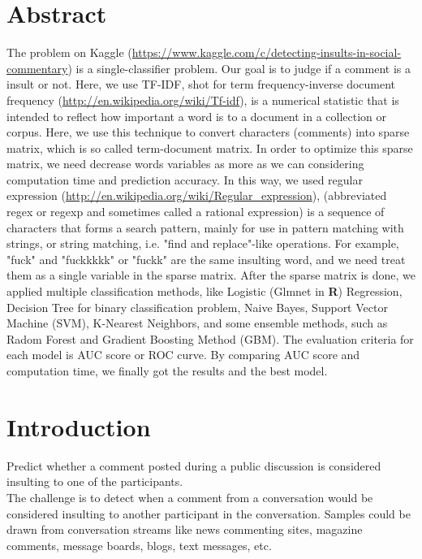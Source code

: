 \documentclass[11pt]{article}
\begin{document}
\begin{singlespacing}
\section{Abstract}
The problem on Kaggle (\url{https://www.kaggle.com/c/detecting-insults-in-social-commentary}) is a single-classifier problem. Our goal is to judge if a comment is a insult or not. Here, we use TF-IDF, shot for  term frequency-inverse document frequency (\url{http://en.wikipedia.org/wiki/Tf-idf}), is a numerical statistic that is intended to reflect how important a word is to a document in a collection or corpus. Here, we use this technique to convert characters (comments) into sparse matrix, which is so called term-document matrix. In order to optimize this sparse matrix, we need decrease words variables as more as we can considering computation time and prediction accuracy. In this way, we used regular expression (\url{http://en.wikipedia.org/wiki/Regular_expression}), (abbreviated regex or regexp and sometimes called a rational expression) is a sequence of characters that forms a search pattern, mainly for use in pattern matching with strings, or string matching, i.e. "find and replace"-like operations. For example, "fuck" and "fuckkkkk" or "fuckk" are the same insulting word, and we need treat them as a single variable in the sparse matrix. After the sparse matrix is done, we applied multiple classification methods, like Logistic (Glmnet in \textbf{R}) Regression, Decision Tree for binary classification problem, Naive Bayes, Support Vector Machine (SVM), K-Nearest Neighbors, and some ensemble methods, such as Radom Forest and Gradient Boosting Method (GBM). The evaluation criteria for each model is AUC score or ROC curve. By comparing AUC score and computation time, we finally got the results and the best model.

\section{Introduction} %
Predict whether a comment posted during a public discussion is considered insulting to one of the participants.\\

The challenge is to detect when a comment from a conversation would be considered insulting to another participant in the conversation. Samples could be drawn from conversation streams like news commenting sites, magazine comments, message boards, blogs, text messages, etc.\\


\end{singlespacing}
\end{document}
